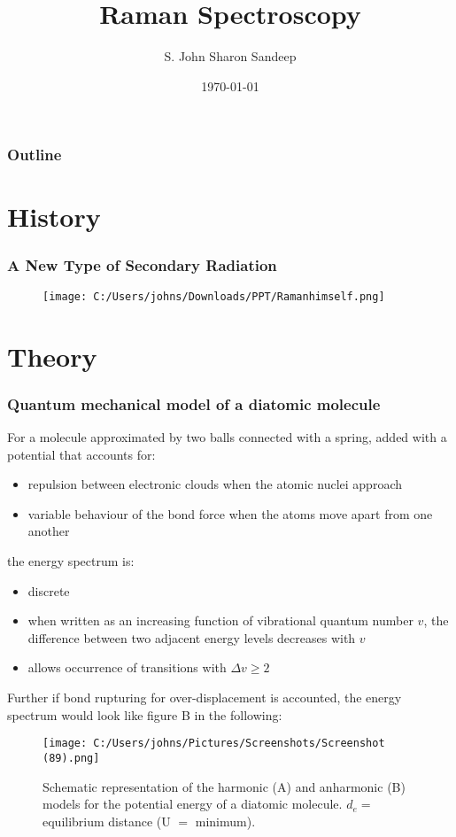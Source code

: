 \documentclass{beamer}
\title{Raman Spectroscopy}
\author{S. John Sharon Sandeep}
\date{\today}
\begin{document}
\begin{frame}
\titlepage
\end{frame}

\begin{frame}
\frametitle{Outline}
\tableofcontents
\end{frame}

\section{History}
\begin{frame}
\frametitle{A New Type of Secondary Radiation}
\begin{figure}[ht]
  \centering
  \texttt{[image: C:/Users/johns/Downloads/PPT/Ramanhimself.png]}
    \caption{}
    \label{fig:1}
\end{figure}
\end{frame}

\section{Theory}
\begin{frame}
\frametitle{Quantum mechanical model of a diatomic molecule}
For a molecule approximated by two balls connected with a spring, added with a potential that accounts for:
\begin{itemize}[\textbullet]
\item repulsion between electronic clouds when the atomic nuclei approach
\item variable behaviour of the bond force when the atoms move apart from one another
\end{itemize}
the energy spectrum is:
\begin{itemize}[\textbullet]
\item discrete 
\item when written as an increasing function of vibrational quantum number $v$, the difference between two adjacent energy levels decreases with $v$
\item allows occurrence of transitions with $\Delta v \geq 2$
\end{itemize}
\end{frame}

\begin{frame}
Further if bond rupturing for over-displacement is accounted, the energy spectrum would look like figure B in the following:
\begin{figure}[ht]
  \centering
  \texttt{[image: C:/Users/johns/Pictures/Screenshots/Screenshot (89).png]}
  \caption{Schematic representation of the harmonic (A) and anharmonic (B) models for the potential energy of a diatomic molecule. $d_e=$ equilibrium distance (U $=$ minimum).}
  \label{fig:diatomicspectrum}
\end{figure}
\end{frame}
\end{document}
